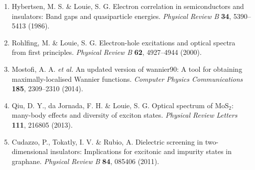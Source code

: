 \documentclass[11pt,a4paper]{article}
\begin{document}
\begin{enumerate}
    \item Hybertsen, M. S. \& Louie, S. G. Electron correlation in semiconductors and insulators: Band gaps and quasiparticle energies. \textit{Physical Review B} \textbf{34}, 5390–5413 (1986).
    
    \item Rohlfing, M. \& Louie, S. G. Electron-hole excitations and optical spectra from first principles. \textit{Physical Review B} \textbf{62}, 4927–4944 (2000).
    
    \item Mostofi, A. A. \textit{et al.} An updated version of wannier90: A tool for obtaining maximally-localised Wannier functions. \textit{Computer Physics Communications} \textbf{185}, 2309–2310 (2014).
    
    \item Qiu, D. Y., da Jornada, F. H. \& Louie, S. G. Optical spectrum of MoS$_2$: many-body effects and diversity of exciton states. \textit{Physical Review Letters} \textbf{111}, 216805 (2013).
    
    \item Cudazzo, P., Tokatly, I. V. \& Rubio, A. Dielectric screening in two-dimensional insulators: Implications for excitonic and impurity states in graphane. \textit{Physical Review B} \textbf{84}, 085406 (2011).
\end{enumerate}
\end{document}

